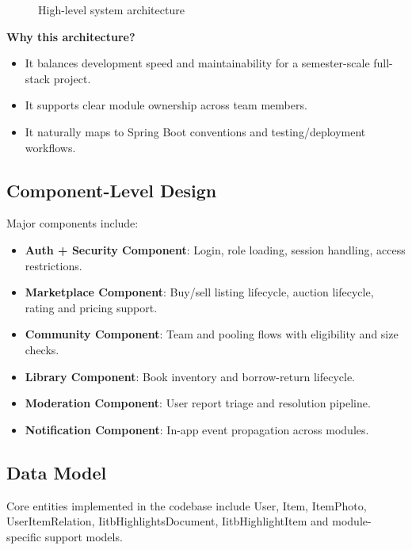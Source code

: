 \documentclass[12pt,a4paper]{article}
\begin{document}
\begin{figure}[H]
\centering
{}
\caption{High-level system architecture}
\end{figure}

\textbf{Why this architecture?}
\begin{itemize}[leftmargin=*]
    \item It balances development speed and maintainability for a semester-scale full-stack project.
    \item It supports clear module ownership across team members.
    \item It naturally maps to Spring Boot conventions and testing/deployment workflows.
\end{itemize}

\subsection{Component-Level Design}
Major components include:
\begin{itemize}[leftmargin=*]
    \item \textbf{Auth + Security Component}: Login, role loading, session handling, access restrictions.
    \item \textbf{Marketplace Component}: Buy/sell listing lifecycle, auction lifecycle, rating and pricing support.
    \item \textbf{Community Component}: Team and pooling flows with eligibility and size checks.
    \item \textbf{Library Component}: Book inventory and borrow-return lifecycle.
    \item \textbf{Moderation Component}: User report triage and resolution pipeline.
    \item \textbf{Notification Component}: In-app event propagation across modules.
\end{itemize}

\subsection{Data Model}
Core entities implemented in the codebase include User, Item, ItemPhoto, UserItemRelation, IitbHighlightsDocument, IitbHighlightItem and module-specific support models.
\end{document}
